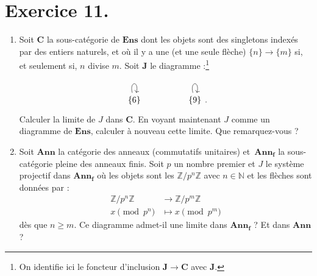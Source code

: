 \documentclass{../../td}
\makeatletter
\newcommand\showfootnote{%
  \tfn@tablefootnoteprintout%
  \gdef\tfn@fnt{0}%
}
\makeatother
\begin{document}
  \chapter{Exercice 11.}

  \begin{slshape}
    \color{deepblue}

    \begin{enumerate}
      \item Soit $\mathbf{C}$ la sous-catégorie de $\mathbf{Ens}$ dont les objets sont des singletons indexés par des entiers naturels, et où il y a une (et une seule flèche) $\{n\} \to  \{m\}$ si, et seulement si, $n$ divise $m$.
        Soit $\mathbf{J}$ le diagramme :\footnote{On identifie ici le foncteur d'inclusion $\mathbf{J} \to \mathbf{C}$ avec $\mathbf{J}$.}
        \showfootnote
        \[
        \begin{tikzcd}
          \{6\}\arrow[loop above] & & 
          \{9\}\arrow[loop above]
        \end{tikzcd}
        .\] 
        Calculer la limite de $J$ dans $\mathbf{C}$. En voyant maintenant $J$ comme un diagramme de $\mathbf{Ens}$, calculer à nouveau cette limite. Que remarquez-vous ?
      \item Soit $\mathbf{Ann}$ la catégorie des anneaux (commutatifs unitaires) et~$\mathbf{Ann_f}$ la sous-catégorie pleine des anneaux finis.
        Soit $p$ un nombre premier et $J$ le système projectif dans $\mathbf{Ann_f}$ où les objets sont les $\mathds{Z} / p^n \mathds{Z}$ avec $n \in \mathds{N}$ et les flèches sont données par :
        \begin{align*}
          \mathds{Z} / p^n \mathds{Z} &\longrightarrow \mathds{Z} / p^m \mathds{Z} \\
          x \pmod{p^n} &\longmapsto x \pmod{p^m}
        \end{align*}
        dès que $n \ge m$.
        Ce diagramme admet-il une limite dans $\mathbf{Ann_f}$ ? Et dans $\mathbf{Ann}$ ?
    \end{enumerate}
  \end{slshape}
\end{document}
